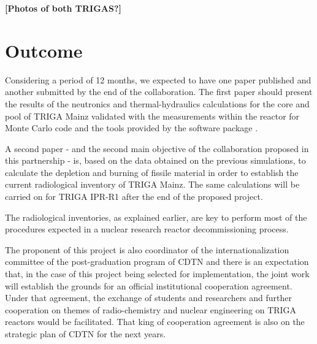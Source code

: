 \documentclass[11pt]{article} %
\begin{document}


\textbf{[Photos of both TRIGAS?]}

\section{Outcome}

Considering a period of 12 months, we expected to have one paper published and another submitted by the end of the collaboration. The first paper should present the results of the neutronics and thermal-hydraulics calculations for the core and pool of TRIGA Mainz validated with the measurements within the reactor for \cite[OpenMC]{OpenMC_2015} Monte Carlo code and the tools provided by the software package \cite[SCALE]{SCALE_632}.


A second paper - and the second main objective of the collaboration proposed in this partnership - is, based on the data obtained on the previous simulations, to calculate the depletion and burning of fissile material in order to establish the current radiological inventory of TRIGA Mainz. The same calculations will be carried on for TRIGA IPR-R1 after the end of the proposed project.

The radiological inventories, as explained earlier, are key to perform most of the procedures expected in a nuclear research reactor decommissioning process.

The proponent of this project is also coordinator of the internationalization committee of the post-graduation program of CDTN and there is an expectation that, in the case of this project being selected for implementation, the joint work will establish the grounds for an official institutional cooperation agreement. Under that agreement, the exchange of students and researchers and further cooperation on themes of radio-chemistry and nuclear engineering on TRIGA reactors would be facilitated. That king of cooperation agreement is also on the strategic plan of CDTN for the next years.
\end{document}
